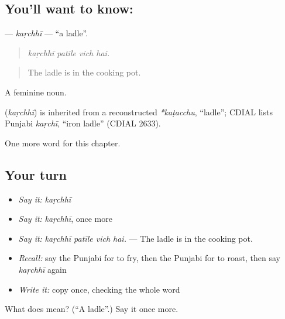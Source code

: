 \subsection*{You'll want to know: }
\textbf{} — \emph{kaṛchhī} — \textquotedblleft{}a ladle\textquotedblright{}.

\begin{quote}
   
\end{quote}

\begin{quote}
\emph{kaṛchhī patīle vich hai.}
\end{quote}

\begin{quote}
The ladle is in the cooking pot.
\end{quote}

A feminine noun.

\begin{cousinweb}
\textbf{} (\emph{kaṛchhī}) is inherited from a reconstructed \emph{*kaṭacchu}, \textquotedblleft{}ladle\textquotedblright{}; CDIAL lists Punjabi \emph{kaṛchī}, \textquotedblleft{}iron ladle\textquotedblright{} (CDIAL 2633).
\end{cousinweb}

\begin{grammarlens}[title={What you've built}]
One more word for this chapter.
\end{grammarlens}

\subsection*{Your turn}
\begin{itemize}
\raggedright
  \item \emph{Say it:} \emph{kaṛchhī}
  \item \emph{Say it:} \emph{kaṛchhī}, once more
  \item \emph{Say it:} \emph{kaṛchhī patīle vich hai.} — The ladle is in the cooking pot.
  \item \emph{Recall:} say the Punjabi for to fry, then the Punjabi for to roast, then say \emph{kaṛchhī} again
  \item \emph{Write it:} copy \textbf{} once, checking the whole word
\end{itemize}

\begin{tcolorbox}[breakable,colback=teal!4,colframe=teal!35!black,title={Before you move on}]
What does  mean? (\textquotedblleft{}A ladle\textquotedblright{}.) Say it once more.
\end{tcolorbox}
